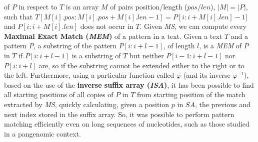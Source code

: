 \documentclass[a4paper,11pt, oneside]{article}
\begin{document}
of $P$ in respect to $T$ is an array $M$ of pairs position/length ($pos$/$len$),
$|M|=|P|$, such that $T[M[i].pos:M[i].pos+M[i].len-1]=P[i:i+M[i].len]-1]$ and
$P[i:i+M[i].len]$ does not occur in $T$. Given \textit{MS}, we can compute every
\textbf{Maximal Exact Match (\textit{MEM})} of a pattern in a text. Given a
text $T$ and a pattern $P$, a substring of the pattern $P[i : i+l-1]$, of length
$l$, is a \textit{MEM} of $P$ in $T$ if $P[i:i+l-1]$ is a substring of $T$ but
neither $P[i-1:i+l-1]$ nor $P[i:i+l]$ are, so if the substring cannot be
extended either to the right or to the left. Furthermore, using a particular
function called $\varphi$ (and its inverse $\varphi^{-1}$), based on the use
of the \textbf{inverse suffix array (\textit{ISA})}, it has been possible to
find all starting positions of all copies of $P$ in $T$ from starting position
of the match extracted by \textit{MS}, quickly calculating, given a position $p$
in $SA$, the previous and next index stored in the suffix array.
So, it was possible to perform pattern matching
efficiently even on long sequences of nucleotides, such as those studied in
a pangenomic context.
\end{document}
